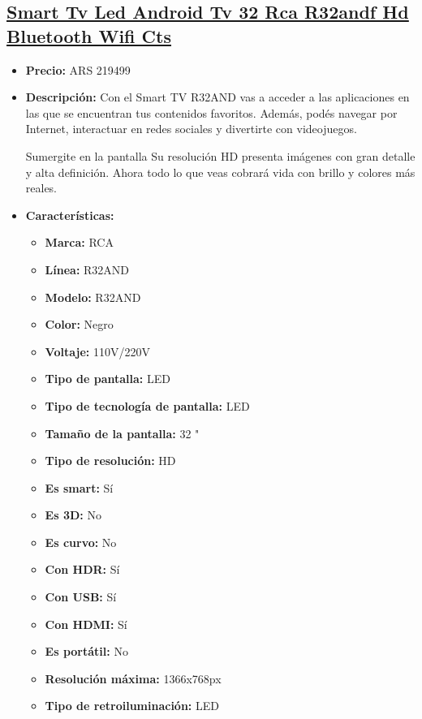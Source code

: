\documentclass{article}
\begin{document}
\begin{adjustwidth}{2em}{}

\subsection{\uline{\href{https://www.mercadolibre.com.ar/smart-tv-led-android-tv-32-rca-r32andf-hd-bluetooth-wifi-cts/p/MLA27977446}{Smart Tv Led Android Tv 32 Rca R32andf Hd Bluetooth Wifi Cts}}}
\begin{itemize}
    \item \textbf{Precio:} ARS 219499
    \item \textbf{Descripción:} 
Con el Smart TV R32AND vas a acceder a las aplicaciones en las que se encuentran tus contenidos favoritos. Además, podés navegar por Internet, interactuar en redes sociales y divertirte con videojuegos.

Sumergite en la pantalla
Su resolución HD presenta imágenes con gran detalle y alta definición. Ahora todo lo que veas cobrará vida con brillo y colores más reales.
    \item \textbf{Características:} 
    \begin{itemize}
        \item \textbf {Marca:} RCA
    \item \textbf {Línea:} R32AND
    \item \textbf {Modelo:} R32AND
    \item \textbf {Color:} Negro
    \item \textbf {Voltaje:} 110V/220V
    \item \textbf {Tipo de pantalla:} LED
    \item \textbf {Tipo de tecnología de pantalla:} LED
    \item \textbf {Tamaño de la pantalla:} 32 "
    \item \textbf {Tipo de resolución:} HD
    \item \textbf {Es smart:} Sí
    \item \textbf {Es 3D:} No
    \item \textbf {Es curvo:} No
    \item \textbf {Con HDR:} Sí
    \item \textbf {Con USB:} Sí
    \item \textbf {Con HDMI:} Sí
    \item \textbf {Es portátil:} No
    \item \textbf {Resolución máxima:} 1366x768px
    \item \textbf {Tipo de retroiluminación:} LED
    \end{itemize}
\end{itemize}

\vspace{1\baselineskip} %
\end{adjustwidth}
\end{document}
